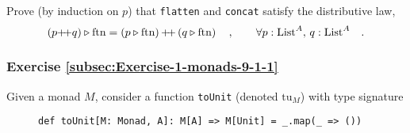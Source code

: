 Prove (by induction on $p$) that \lstinline!flatten! and \lstinline!concat!
satisfy the distributive law,
\[
\left(p{\displaystyle }{+\negmedspace+} q\right)\triangleright\text{ftn}=\left(p\triangleright\text{ftn}\right){\displaystyle }{+\negmedspace+}\left(q\triangleright\text{ftn}\right)\quad,\quad\quad\forall p:\text{List}^{A},\,q:\text{List}^{A}\quad.
\]
\begin{comment}

\subparagraph{Solution}

The values $p$ and $q$ must have type $\text{List}^{\text{List}^{A}}$.
There are two possibilities: $p$ is an empty list ($p=1+\bbnum 0$),
and $p=\bbnum 0+h\times t$. If $p$ is empty, so is $p\triangleright\text{ftn}$
and the law holds. In the other case, we have (due to the code of
$\pplus$) that
\[
\left(\bbnum 0+h\times t\right)\pplus q=\bbnum 0+h\times\left(t\pplus q\right)\quad,
\]
and so
\begin{align*}
 & \left(p\pplus q\right)\triangleright\text{ftn}=\left(\bbnum 0+h\times\left(t\pplus q\right)\right)\triangleright\text{ftn}=h\pplus\gunderline{\left(t\pplus q\right)\triangleright\overline{\text{ftn}}}\\
{\color{greenunder}\text{inductive assumption}:}\quad & =\gunderline{h\pplus\left(t\triangleright\overline{\text{ftn}}\right)}\pplus\left(q\triangleright\overline{\text{ftn}}\right)\\
{\color{greenunder}\text{code of }\text{ftn}:}\quad & =\left(\bbnum 0+h\times t\right)\triangleright\overline{\text{ftn}}\pplus\left(q\triangleright\overline{\text{ftn}}\right)=\left(p\triangleright\text{ftn}\right)\pplus\left(q\triangleright\text{ftn}\right)\quad.
\end{align*}
\end{comment}


\subsubsection{Exercise \label{subsec:Exercise-1-monads-9-1-1}\ref{subsec:Exercise-1-monads-9-1-1}}

Given a monad $M$, consider a function \lstinline!toUnit! (denoted
$\text{tu}_{M}$) with type signature

\begin{wrapfigure}{l}{0.58\columnwidth}%
\vspace{-0.5\baselineskip}
\begin{lstlisting}
def toUnit[M: Monad, A]: M[A] => M[Unit] = _.map(_ => ())
\end{lstlisting}

\vspace{-0.5\baselineskip}
\end{wrapfigure}%

